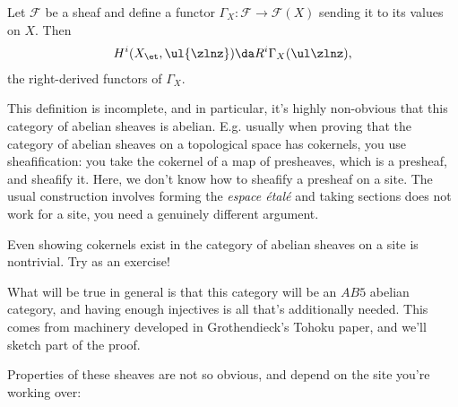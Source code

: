 \begin{definition}

Let \(\mathcal{F}\) be a sheaf and define a functor
\(\Gamma_X: \mathcal{F}\to \mathcal{F}(X)\) sending it to its values on
\(X\). Then
\begin{align*}  
H^i(X_\et, \ul{\zlnz}) \da R^i \Gamma_X(\ul \zlnz)
,\end{align*} the right-derived functors of \(\Gamma_X\).

\end{definition}

\begin{remark}

This definition is incomplete, and in particular, it's highly
non-obvious that this category of abelian sheaves is abelian. E.g.
usually when proving that the category of abelian sheaves on a
topological space has cokernels, you use sheafification: you take the
cokernel of a map of presheaves, which is a presheaf, and sheafify it.
Here, we don't know how to sheafify a presheaf on a site. The usual
construction involves forming the \emph{espace étalé} and taking
sections does not work for a site, you need a genuinely different
argument.

\end{remark}

\begin{warnings}

Even showing cokernels exist in the category of abelian sheaves on a
site is nontrivial. Try as an exercise!

\end{warnings}

\begin{remark}

What will be true in general is that this category will be an \(AB5\)
abelian category, and having enough injectives is all that's
additionally needed. This comes from machinery developed in
Grothendieck's Tohoku paper, and we'll sketch part of the proof.

\end{remark}

Properties of these sheaves are not so obvious, and depend on the site
you're working over:

